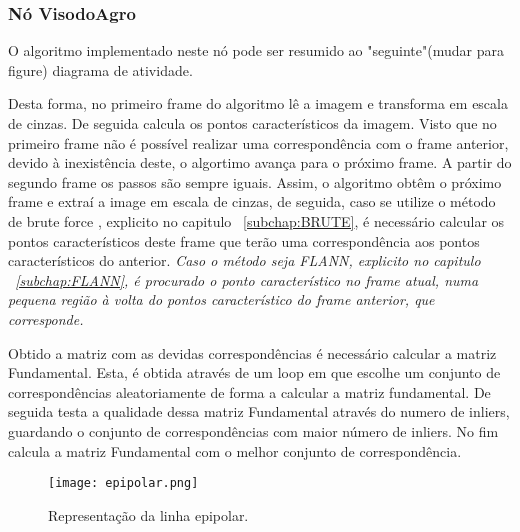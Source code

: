 \subsubsection{Nó VisodoAgro}

	O algoritmo implementado neste nó pode ser resumido ao "seguinte"(mudar para figure) diagrama de atividade.
	
	
	Desta forma, no primeiro frame do algoritmo lê a imagem e transforma em escala de cinzas. De seguida calcula os pontos característicos da imagem. Visto que no primeiro frame não é possível realizar uma correspondência com o frame anterior, devido à inexistência deste, o algortimo avança para o próximo frame. A partir do segundo frame os passos são sempre iguais. Assim, o algoritmo obtêm o próximo frame e extraí a image em escala de cinzas, de seguida, caso se utilize o método de brute force , explicito no capitulo ~\ref{subchap:BRUTE}, é necessário calcular os pontos característicos deste frame que terão uma correspondência aos pontos característicos do anterior. \textit{Caso o método seja FLANN, explicito no capitulo ~\ref{subchap:FLANN}, é procurado o ponto característico no frame atual, numa pequena região à volta do pontos característico do frame anterior, que corresponde.}
	
	Obtido a matriz com as devidas correspondências é necessário calcular a matriz Fundamental. Esta, é obtida através de um loop em que escolhe um conjunto de correspondências aleatoriamente de forma a calcular a matriz fundamental. De seguida testa a qualidade dessa matriz Fundamental através do numero de inliers, guardando o conjunto de correspondências com maior número de inliers. No fim calcula a matriz Fundamental com o melhor conjunto de correspondência.
	
	
	\begin{figure}[h!] %
		\begin{center}
			\leavevmode		
			\texttt{[image: epipolar.png]}
			\caption{Representação da linha epipolar.}
			\label{fig:equ}
		\end{center}
	\end{figure}

